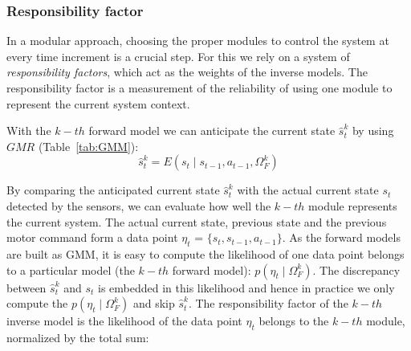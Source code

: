 %

\subsubsection{Responsibility factor}
\label{sec:rf}

In a modular approach, choosing the proper modules to control the
system at every time increment is a crucial step. For this we rely on
a system of {\em responsibility factors}, which act as the weights of
the inverse models. The responsibility factor is a measurement of the
reliability of using one module to represent the current system
context.

%
%

With the $k-{th}$ forward model we can anticipate the current state ${\hat{s}} ^k_t$ by using $GMR$ (Table~\ref{tab:GMM}):
\begin{equation}
\label{e3}
{\hat{s}} ^k_{t} = E\left({s_t {\mid} s_{t-1}, a_{t-1}, \Omega^k_F}\right)
\end{equation}

By comparing the anticipated current state ${\hat{s}} ^k_t$ with the
actual current state $s_t$ detected by the sensors, we can evaluate
how well the $k-{th}$ module represents the current system. The actual
current state, previous state and the previous motor command form a
data point $\eta_t$ = $\{s_t,s_{t-1},a_{t-1}\}$. As the forward models
are built as GMM, it is easy to compute the likelihood of one data
point belongs to a particular model (the $k-th$ forward model): $p(\eta_t {\mid}
\Omega_F^k)$. The discrepancy between $\hat{s}^k_t$ and $s_t$ is
embedded in this likelihood and hence in practice we only compute the
$p(\eta_t {\mid} \Omega_F^k)$ and skip ${\hat{s}} ^k_t$.  The
responsibility factor of the $k-{th}$ inverse model is the likelihood of
the data point $\eta_t$ belongs to the $k-{th}$ module, normalized by
the total sum:

